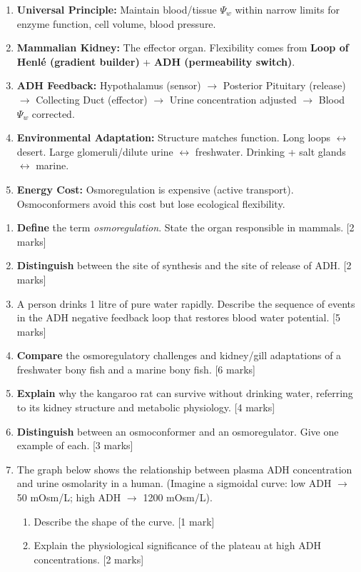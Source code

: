 \documentclass[11pt]{article}
\begin{document}
\begin{aretenir}
\begin{enumerate}
    \item \textbf{Universal Principle:} Maintain blood/tissue $\Psi_w$ within narrow limits for enzyme function, cell volume, blood pressure.
    \item \textbf{Mammalian Kidney:} The effector organ. Flexibility comes from \textbf{Loop of Henlé (gradient builder)} + \textbf{ADH (permeability switch)}.
    \item \textbf{ADH Feedback:} Hypothalamus (sensor) $\rightarrow$ Posterior Pituitary (release) $\rightarrow$ Collecting Duct (effector) $\rightarrow$ Urine concentration adjusted $\rightarrow$ Blood $\Psi_w$ corrected.
    \item \textbf{Environmental Adaptation:} Structure matches function. Long loops $\leftrightarrow$ desert. Large glomeruli/dilute urine $\leftrightarrow$ freshwater. Drinking + salt glands $\leftrightarrow$ marine.
    \item \textbf{Energy Cost:} Osmoregulation is expensive (active transport). Osmoconformers avoid this cost but lose ecological flexibility.
\end{enumerate}
\end{aretenir}

\begin{exercice}
\begin{enumerate}
    \item \textbf{Define} the term \emph{osmoregulation}. State the organ responsible in mammals. [2 marks]
    \item \textbf{Distinguish} between the site of synthesis and the site of release of ADH. [2 marks]
    \item A person drinks 1 litre of pure water rapidly. Describe the sequence of events in the ADH negative feedback loop that restores blood water potential. [5 marks]
    \item \textbf{Compare} the osmoregulatory challenges and kidney/gill adaptations of a freshwater bony fish and a marine bony fish. [6 marks]
    \item \textbf{Explain} why the kangaroo rat can survive without drinking water, referring to its kidney structure and metabolic physiology. [4 marks]
    \item \textbf{Distinguish} between an osmoconformer and an osmoregulator. Give one example of each. [3 marks]
    \item The graph below shows the relationship between plasma ADH concentration and urine osmolarity in a human. (Imagine a sigmoidal curve: low ADH $\rightarrow$ 50 mOsm/L; high ADH $\rightarrow$ 1200 mOsm/L).
    \begin{enumerate}
        \item Describe the shape of the curve. [1 mark]
        \item Explain the physiological significance of the plateau at high ADH concentrations. [2 marks]
    \end{enumerate}
\end{enumerate}
\end{exercice}
\end{document}
